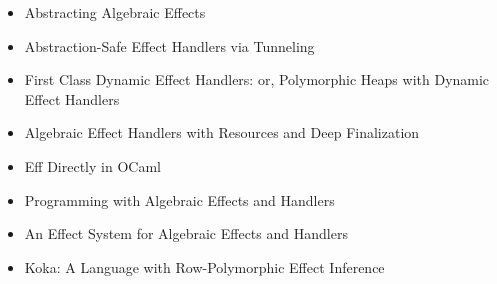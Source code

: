 
\begin{itemize}
\item Abstracting Algebraic Effects
\item Abstraction-Safe Effect Handlers via Tunneling
\item First Class Dynamic Effect Handlers: or, Polymorphic Heaps with Dynamic Effect Handlers
\item Algebraic Effect Handlers with Resources and Deep Finalization
\item Eff Directly in OCaml
\item Programming with Algebraic Effects and Handlers
\item An Effect System for Algebraic Effects and Handlers
\item Koka: A Language with Row-Polymorphic Effect Inference
\end{itemize}
